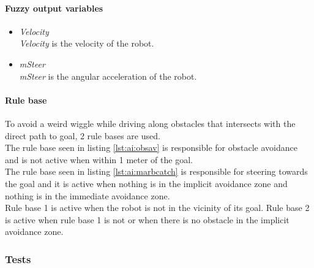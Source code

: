 \documentclass[../../../Main.tex]{subfiles}
\begin{document}
%	

\paragraph{Fuzzy output variables}%
\label{par:output_variables}
\begin{itemize}
	\item \textit{Velocity} \\
		\textit{Velocity} is the velocity of the robot.
	\item \textit{mSteer} \\
		\textit{mSteer} is the angular acceleration of the robot.
\end{itemize}

\paragraph{Rule base}%
\label{par:rulebase}

To avoid a weird wiggle while driving along obstacles that intersects with the direct path to goal, 
2 rule bases are used.\\
The rule base seen in listing \ref{lst:ai:obsav} is responsible for obstacle avoidance and is not
active when within 1 meter of the goal.\\
The rule base seen in listing \ref{lst:ai:marbcatch} is responsible for steering towards the goal
and it is active when nothing is in the implicit avoidance zone and nothing is in the
immediate avoidance zone.\\
Rule base 1 is active when the robot is not in the vicinity of its goal.
Rule base 2 is active when rule base 1 is not or when there is no obstacle in the implicit
avoidance zone.

 

 

\subsubsection{Tests}%
\label{ssub:activation}
\end{document}
